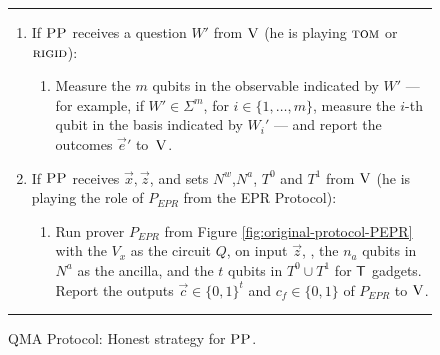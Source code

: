 \begin{figure}[H]
\rule[1ex]{\textwidth}{0.5pt}
\vspace{-20pt}
\begin{enumerate}
  \item If $\textsc{PP}$ receives a question ${W}'$ from $\textsc{V}$ (he is playing $\textsc{tom}$ or $\textsc{rigid}$):
\begin{enumerate}
     \item[]  Measure the $m$ qubits in the observable indicated by $W'$ --- for example, if $W'\in\Sigma^m$, for $i\in \{1,\ldots,m\}$, measure the $i$-th qubit in the basis indicated by $W_i'$ --- and report
       the outcomes $\vec{e}'$ to~$\textsc{V}$.
\end{enumerate}
\item If $\textsc{PP}$ receives $\vec{x}, \vec{z}$, and sets $N^w$,$N^a$, $T^0$ and $T^1$ from $\textsc{V}$ (he is playing the role of $P_{EPR}$ from the EPR Protocol):
\begin{enumerate}
     \item[] Run  prover $P_{EPR}$ from Figure
       \ref{fig:original-protocol-PEPR} with the $V_x$ as the circuit $Q$, on input $\vec{z}$, , the $n_a$ qubits in 
        $N^a$ as the ancilla, and the $t$ qubits in $T^0\cup T^1$ for $\sf T$ gadgets.
     Report the outputs $\vec{c}\in\{0,1\}^t$ and $c_f\in\{0,1\}$ of $P_{EPR}$  to $\textsc{V}$. 
\end{enumerate}
\end{enumerate}
\rule[2ex]{\textwidth}{0.5pt}\vspace{-.5cm}
\caption{QMA Protocol: Honest strategy for $\textsc{PP}$.}\label{fig:qma-protocol-PP}
\end{figure}


